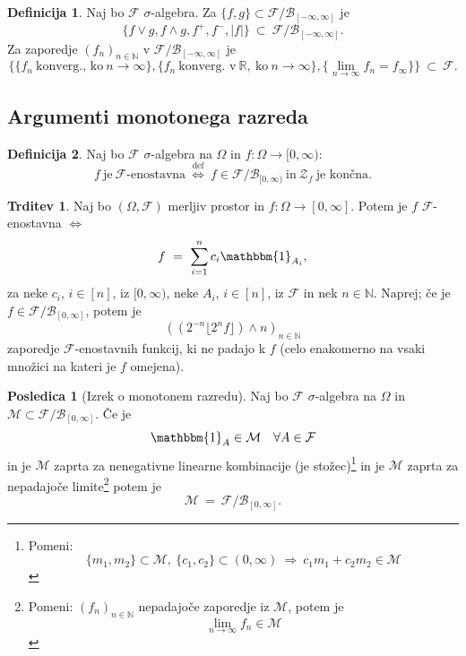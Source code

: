 \documentclass[11pt]{article}
\newcommand{\R}{\mathbb{R}}
\newcommand{\N}{\mathbb{N}}
\newcommand{\F}{\mathcal{F}}
\newcommand{\Z}{\mathcal{Z}}
\newcommand{\M}{\mathcal{M}}
\newcommand{\B}{\mathscr{B}}
\newcommand{\diff}{\overset{\text{def}}{\iff}}
\newcommand{\set}[1]{\{#1\}}
\newcommand{\oklepaj}[1]{\left(#1\right)}
\newcommand{\1}{\mathbbm{1}}
\newcommand{\rr}{[-\infty,\infty]}
\newcommand{\floor}[1]{\lfloor#1\rfloor}
\theoremstyle{definition}
\newtheorem{definicija}{Definicija}[section]
\theoremstyle{definition}
\newtheorem{trditev}{Trditev}[section]
\theoremstyle{definition}
\theoremstyle{definition}
\newtheorem*{posledica}{Posledica}
\begin{document}
\begin{definicija}

Naj bo $\F$ $\sigma$-algebra. Za $\set{f,g} \subset \F/\B_{\rr}$ je
$$\set{f \vee g, f \wedge g, f^+, f^-, |f|} ~\subset~ \F/\B_{\rr}.$$
Za zaporedje $(f_n)_{n \in \N}$ v $\F/\B_{\rr}$ je
$$\set{\set{f_n~\text{konverg., ko}~n\rightarrow\infty},\set{f_n~\text{konverg. v}~\R,~\text{ko}~n\rightarrow\infty},\set{\lim_{n\rightarrow\infty} f_n = f_\infty}} ~\subset~ \F.$$

\end{definicija}
\vspace{0.5cm}


\subsection{Argumenti monotonega razreda}
\vspace{0.5cm}

\begin{definicija}

Naj bo $\F$ $\sigma$-algebra na $\Omega$ in $f: \Omega \rightarrow [0, \infty)$:
$$f ~\text{je}~ \F\text{-enostavna} ~\diff~ f \in \F/\B_{[0, \infty)} ~\text{in}~ \Z_f ~\text{je končna}.$$

\end{definicija}
\vspace{0.5cm}

\begin{trditev}

Naj bo $(\Omega, \F)$ merljiv prostor in $f: \Omega \rightarrow [0, \infty]$. Potem je $f$ $\F$-enostavna $\iff$
$$f ~=~ \sum_{i=1}^n c_i \1_{A_i},$$
za neke $c_i$, $i \in [n]$, iz $[0, \infty)$, neke $A_i$, $i \in [n]$, iz $\F$ in nek $n \in \N$. Naprej; če je $f \in \F/\B_{[0, \infty]}$, potem je 
$$\oklepaj{(2^{-n}\floor{2^n f}) \wedge n}_{n \in \N}$$
zaporedje $\F$-enostavnih funkcij, ki ne padajo k $f$ (celo enakomerno na vsaki množici na kateri je $f$ omejena).

\end{trditev}
\vspace{0.5cm}

\begin{posledica}[Izrek o monotonem razredu]

Naj bo $\F$ $\sigma$-algebra na $\Omega$ in \hbox{$\M \subset \F/\B_{[0,\infty]}$}. Če je
$$\1_A \in \M \quad \forall A \in \F$$
in je $\M$ zaprta za nenegativne linearne kombinacije (je stožec)\footnote{Pomeni: $$\set{m_1,m_2}\subset\M, ~\set{c_1,c_2}\subset(0,\infty) ~\Rightarrow~ c_1 m_1 + c_2 m_2 \in \M$$} in je $\M$ zaprta za nepadajoče limite\footnote{Pomeni: $(f_n)_{n \in \N}$ nepadajoče zaporedje iz $\M$, potem je $$\lim_{n \rightarrow \infty} f_n \in \M$$} potem je
$$\M ~=~ \F/\B_{[0, \infty]}.$$

\end{posledica}
\vspace{0.5cm}
\end{document}
